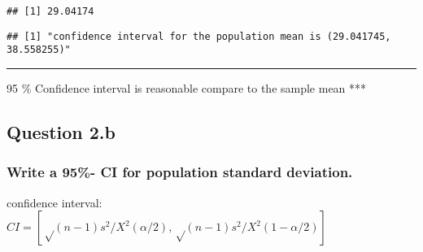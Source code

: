 \documentclass[
]{article}
\newenvironment{Shaded}{\begin{snugshade}}{\end{snugshade}}
\newcommand{\KeywordTok}[1]{\textcolor[rgb]{0.13,0.29,0.53}{\textbf{#1}}}
\newcommand{\NormalTok}[1]{#1}
\newcommand{\OperatorTok}[1]{\textcolor[rgb]{0.81,0.36,0.00}{\textbf{#1}}}
\newcommand{\StringTok}[1]{\textcolor[rgb]{0.31,0.60,0.02}{#1}}
\begin{document}
\begin{verbatim}
## [1] 29.04174
\end{verbatim}

\begin{Shaded}
\end{Shaded}

\begin{verbatim}
## [1] "confidence interval for the population mean is (29.041745, 38.558255)"
\end{verbatim}

\begin{center}\rule{0.5\linewidth}{0.5pt}\end{center}

95 \% Confidence interval is reasonable compare to the sample mean ***

\hypertarget{question-2.b}{%
\subsection{Question 2.b}\label{question-2.b}}

\hypertarget{write-a-95--ci-for-population-standard-deviation.}{%
\subsubsection{Write a 95\%- CI for population standard
deviation.}\label{write-a-95--ci-for-population-standard-deviation.}}

confidence interval:
\(CI = [√(n-1)s^{2}/X^{2}(α/2), √(n-1)s^{2}/ X^{2}(1-α/2)]\)
\end{document}
